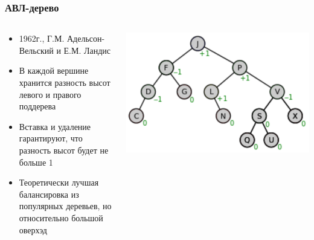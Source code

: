 \documentclass[xetex,mathserif,serif]{beamer}
\begin{document}
	\begin{frame}
		\frametitle{АВЛ-дерево}
		\begin{columns}
			\begin{column}{0.6\textwidth}
				\begin{itemize}
					\item 1962г., Г.М. Адельсон-Вельский и Е.М. Ландис
					\item В каждой вершине хранится разность высот левого и правого поддерева
					\item Вставка и удаление гарантируют, что разность высот будет не больше 1
					\item Теоретически лучшая балансировка из популярных деревьев, но относительно большой оверхэд
				\end{itemize}
			\end{column}
			\begin{column}{0.4\textwidth}
				\begin{center}
					\includegraphics[width=\textwidth]{avlTree.png}
				\end{center}
			\end{column}
		\end{columns}
	\end{frame}
\end{document}
